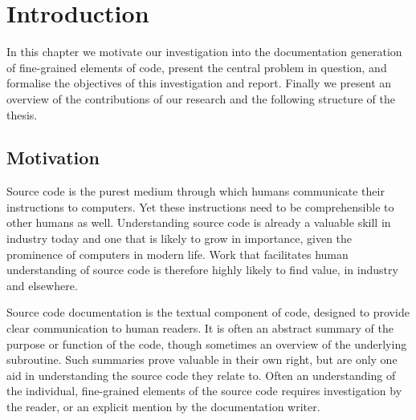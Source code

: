 \chapter{Introduction}
\label{chapterlabel1}




In this chapter we motivate our investigation into the documentation generation of fine-grained elements of code, present the central problem in question, and formalise the objectives of this investigation and report. 
Finally we present an overview of the contributions of our research and the following structure of the thesis.



\section{Motivation} %
\label{sec:motivation}

Source code is the purest medium through which humans communicate their instructions to computers.
Yet these instructions need to be comprehensible to other humans as well.
Understanding source code is already a valuable skill in industry today and one that is likely to grow in importance, given the prominence of computers in modern life.
Work that facilitates human understanding of source code is therefore highly likely to find value, in industry and elsewhere. %

Source code documentation is the textual component of code, designed to provide clear communication to human readers.
It is often an abstract summary of the purpose or function of the code, though sometimes an overview of the underlying subroutine.
Such summaries prove valuable in their own right, but are only one aid in understanding the source code they relate to.
Often an understanding of the individual, fine-grained elements of the source code requires investigation by the reader, or an explicit mention by the documentation writer.

